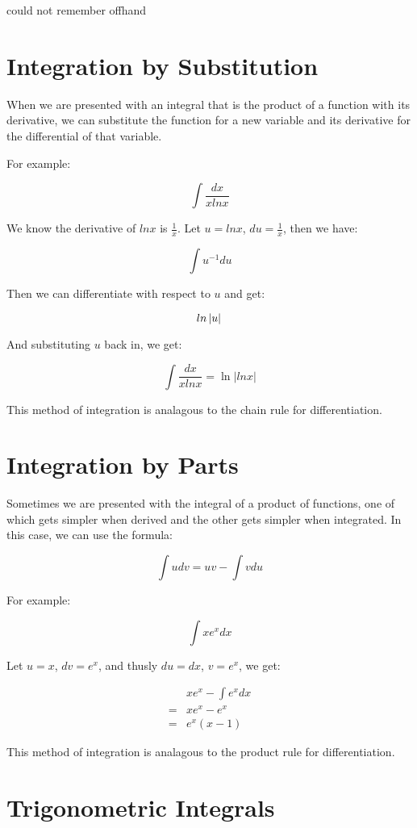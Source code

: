 \documentclass{article}
\begin{document}
{\tiny *could not remember offhand}

\section{Integration by Substitution}

When we are presented with an integral that is the product of a
function with its derivative, we can substitute the function for a new
variable and its derivative for the differential of that variable.

For example:

\[
\int \frac{dx}{xlnx}
\]

We know the derivative of $lnx$ is $\frac{1}{x}$.  Let $u=lnx$,
$du=\frac{1}{x}$, then we have:

\[
\int u^{-1}du
\]

Then we can differentiate with respect to $u$ and get:

\[
ln \left| u \right| \\
\]

And substituting $u$ back in, we get:

\[
\int \frac{dx}{xlnx} = \ln \left| lnx \right|
\]

This method of integration is analagous to the chain rule for
differentiation.

\section{Integration by Parts}

Sometimes we are presented with the integral of a product of
functions, one of which gets simpler when derived and the other gets
simpler when integrated.  In this case, we can use the formula:

\[
\int udv = uv - \int vdu
\]

For example:

\[
\int xe^xdx
\]

Let $u = x$, $dv = e^x$, and thusly $du = dx$, $v = e^x$, we get:

\begin{align*}
  &xe^x - \int e^xdx \\
  = &xe^x - e^x \\
  = &e^x(x-1)
\end{align*}

This method of integration is analagous to the product rule for
differentiation.

\section{Trigonometric Integrals}
\end{document}
